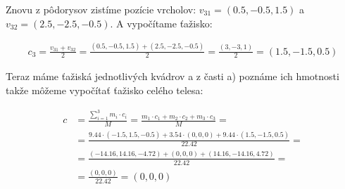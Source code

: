 \documentclass[a4paper]{article}
\begin{document}
	Znovu z pôdorysov zistíme pozície vrcholov: $v_{31} = (0.5, -0.5, 1.5)$ a $v_{32} = (2.5, -2.5, -0.5)$. A vypočítame ťažisko:
	
	\begin{align*}
		c_3 = \frac{v_{31} + v_{32}}{2} = \frac{(0.5, -0.5, 1.5) + (2.5, -2.5, -0.5)}{2} = \frac{(3, -3, 1)}{2} = (1.5, -1.5, 0.5)
	\end{align*}

	Teraz máme ťažiská jednotlivých kvádrov a z časti a) poznáme ich hmotnosti takže môžeme vypočítať ťažisko celého telesa:
	
	\begin{align*}
		c &= \frac{\sum_{i=1}^{3} m_i \cdot c_i}{M} 
		= \frac{m_1 \cdot c_1 + m_2 \cdot c_2 + m_3 \cdot c_3}{M} = 
		\\ 
		&= \frac{9.44 \cdot (-1.5, 1.5, -0.5) + 3.54 \cdot (0, 0, 0) + 9.44 \cdot (1.5, -1.5, 0.5)}{22.42} =
		\\
		&= \frac{(-14.16, 14.16, -4.72) + (0, 0, 0) + (14.16, -14.16, 4.72)}{22.42} = 
		\\
		&= \frac{(0, 0, 0)}{22.42}
		= (0, 0, 0) 
	\end{align*}
\end{document}
